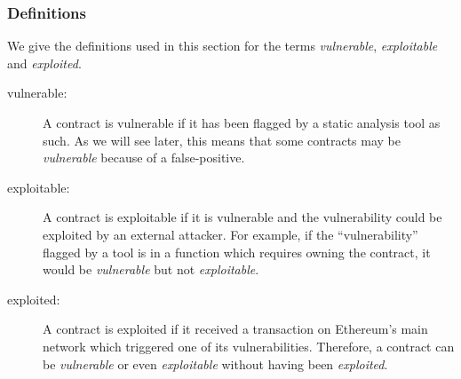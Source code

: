 \subsubsection{Definitions}
\label{ssec:definitions}
We give the definitions used in this section for the terms \emph{vulnerable}, \emph{exploitable} and \emph{exploited}.
\begin{description}
\item[vulnerable:]
  A contract is vulnerable if it has been flagged by a static analysis tool as such.
  As we will see later, this means that some contracts may be \emph{vulnerable} because of a false-positive.
\item[exploitable:]
  A contract is exploitable if it is vulnerable and the vulnerability could be exploited by an external attacker.
  For example, if the ``vulnerability'' flagged by a tool is in a function which requires owning the contract, it would be \emph{vulnerable} but not \emph{exploitable}.
\item[exploited:]
  A contract is exploited if it received a transaction on Ethereum's main network which triggered one of its vulnerabilities.
  Therefore, a contract can be \emph{vulnerable} or even \emph{exploitable} without having been \emph{exploited}.
\end{description}
